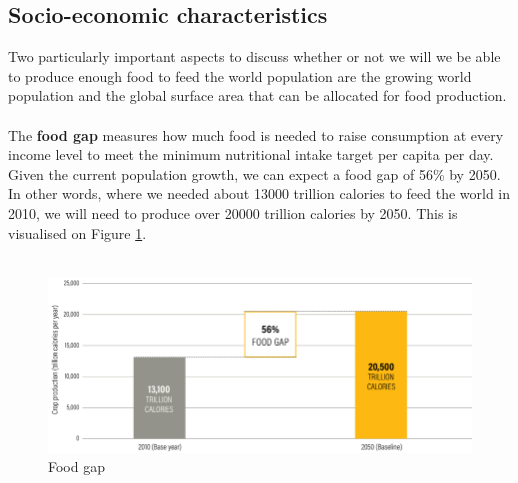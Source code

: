 \documentclass[../summary.tex]{subfiles}
\begin{document}
	\subsection{Socio-economic characteristics}
	
	Two particularly important aspects to discuss whether or not we will we be able to produce enough food to feed the world population are the growing world population and the global surface area that can be allocated for food production. 
	\\\\
	The \textbf{food gap} measures how much food is needed to raise consumption at every income level to meet the minimum nutritional intake target per capita per day. Given the current population growth, we can expect a food gap of 56\% by 2050. In other words, where we needed about 13000 trillion calories to feed the world in 2010, we will need to produce over 20000 trillion calories by 2050. This is visualised on Figure \ref{fig:food_gap}.
	\\\\
	
	\begin{figure}[htbp]
	\centering
	\includegraphics[width=1\linewidth]{images/6-food-gap.png}
	\caption{Food gap}
	\label{fig:food_gap}
	\end{figure}
	
\end{document}
